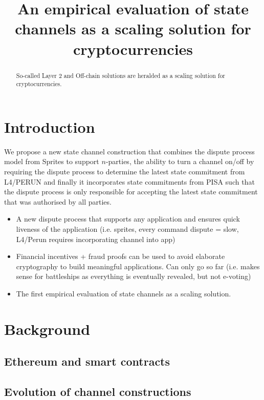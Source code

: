 \documentclass{llncs}
\begin{document}
	\title{An empirical evaluation of state channels as a scaling solution for cryptocurrencies}
	\maketitle
	\begin{abstract}
		So-called Layer 2 and Off-chain solutions are heralded as a scaling solution for cryptocurrencies. 
	\end{abstract} 

\section{Introduction}

We propose a new state channel construction that combines the dispute process model from Sprites to support $n$-parties, the ability to turn a channel on/off by requiring the dispute process to determine the latest state commitment from L4/PERUN and finally it incorporates state commitments from PISA such that the dispute process is only responsible for accepting the latest state commitment that was authorised by all parties. 


\begin{itemize}
\item A new dispute process that supports any application and ensures quick liveness of the application (i.e. sprites, every command dispute = slow, L4/Perun requires incorporating channel into app)
\item Financial incentives + fraud proofs can be used to avoid elaborate cryptography to build meaningful applications. Can only go so far (i.e. makes sense for battleships as everything is eventually revealed, but not e-voting) 
\item The first empirical evaluation of state channels as a scaling solution. 

\end{itemize}
\section{Background}

\subsection{Ethereum and smart contracts}
\subsection{Evolution of channel constructions}
\end{document}

